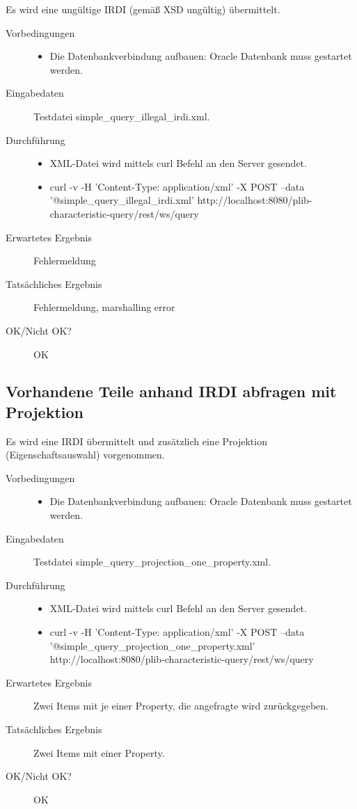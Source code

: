 Es wird eine ungültige IRDI (gemäß XSD ungültig) übermittelt. 

\begin{description}
\item[Vorbedingungen] 
  \begin{itemize}
   \item Die Datenbankverbindung aufbauen: Oracle Datenbank muss gestartet werden.
  \end{itemize}
\item[Eingabedaten] Testdatei simple\_query\_illegal\_irdi.xml. 
\item[Durchführung]
   \begin{itemize}
   \item XML-Datei wird mittels curl Befehl an den Server gesendet.
   \item curl -v -H 'Content-Type: application/xml' -X POST --data '@simple\_query\_illegal\_irdi.xml' http://localhost:8080/plib-characteristic-query/rest/ws/query
  \end{itemize}
\item[Erwartetes Ergebnis] Fehlermeldung
\item[Tatsächliches Ergebnis] Fehlermeldung, marshalling error
\item[OK/Nicht OK?] OK
\end{description}

\subsection{Vorhandene Teile anhand IRDI abfragen mit Projektion}

Es wird eine IRDI übermittelt und zusätzlich eine Projektion (Eigenschaftsauswahl) vorgenommen.

\begin{description}
\item[Vorbedingungen] 
  \begin{itemize}
   \item Die Datenbankverbindung aufbauen: Oracle Datenbank muss gestartet werden.
  \end{itemize}
\item[Eingabedaten] Testdatei simple\_query\_projection\_one\_property.xml. 
\item[Durchführung]
   \begin{itemize}
   \item XML-Datei wird mittels curl Befehl an den Server gesendet.
   \item curl -v -H 'Content-Type: application/xml' -X POST --data '@simple\_query\_projection\_one\_property.xml' http://localhost:8080/plib-characteristic-query/rest/ws/query
  \end{itemize}
\item[Erwartetes Ergebnis] Zwei Items mit je einer Property, die angefragte wird zurückgegeben. 
\item[Tatsächliches Ergebnis] Zwei Items mit einer Property. 
\item[OK/Nicht OK?] OK
\end{description}


